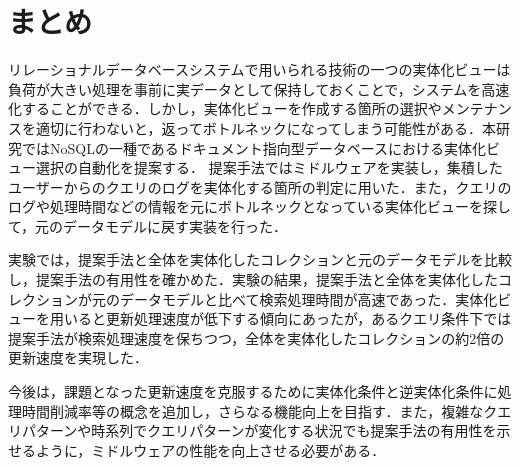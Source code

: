 \documentclass[a4paper,11pt]{ujreport}
\begin{document}
\chapter{まとめ}
\label{chap:Conclusion}
リレーショナルデータベースシステムで用いられる技術の一つの実体化ビューは負荷が大きい処理を事前に実データとして保持しておくことで，システムを高速化することができる．しかし，実体化ビューを作成する箇所の選択やメンテナンスを適切に行わないと，返ってボトルネックになってしまう可能性がある．本研究ではNoSQLの一種であるドキュメント指向型データベースにおける実体化ビュー選択の自動化を提案する．
提案手法ではミドルウェアを実装し，集積したユーザーからのクエリのログを実体化する箇所の判定に用いた．また，クエリのログや処理時間などの情報を元にボトルネックとなっている実体化ビューを探して，元のデータモデルに戻す実装を行った．

実験では，提案手法と全体を実体化したコレクションと元のデータモデルを比較し，提案手法の有用性を確かめた．実験の結果，提案手法と全体を実体化したコレクションが元のデータモデルと比べて検索処理時間が高速であった．実体化ビューを用いると更新処理速度が低下する傾向にあったが，あるクエリ条件下では提案手法が検索処理速度を保ちつつ，全体を実体化したコレクションの約2倍の更新速度を実現した．

今後は，課題となった更新速度を克服するために実体化条件と逆実体化条件に処理時間削減率等の概念を追加し，さらなる機能向上を目指す．また，複雑なクエリパターンや時系列でクエリパターンが変化する状況でも提案手法の有用性を示せるように，ミドルウェアの性能を向上させる必要がある．
\end{document}
